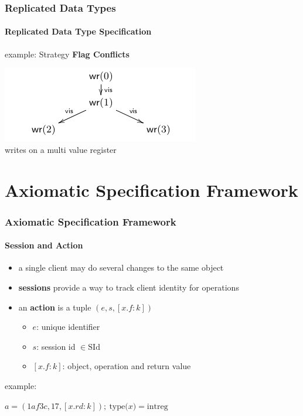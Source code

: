 \documentclass[11pt]{beamer}
\begin{document}
\begin{frame}
\frametitle{Replicated Data Types}
\framesubtitle{Replicated Data Type Specification}
example: Strategy \textbf{Flag Conflicts}
\begin{center}

\includegraphics[scale=0.6]{mvr.png}
\\
writes on a multi value register

\end{center}
\end{frame}

\section{Axiomatic Specification Framework}

\begin{frame}
\frametitle{Axiomatic Specification Framework}
\framesubtitle{Session and Action}
\begin{itemize}
\item a single client may do several changes to the same object
\item \textbf{sessions} provide a way to track client identity for operations
\item an \textbf{action} is a tuple \((e,s,[x.f:k])\)
\begin{itemize}
\item \(e\): unique identifier
\item \(s\): session id \(\in \mathrm{SId}\)
\item \([x.f:k]\): object, operation and return value
\end{itemize}
\end{itemize}
\pause
example:

\begin{center}
\(a = (1af3c, 17, [x.rd: k]);\ \mathrm{type(}x\mathrm{)} = \mathrm{intreg}\)
\end{center}
\end{frame}
\end{document}
